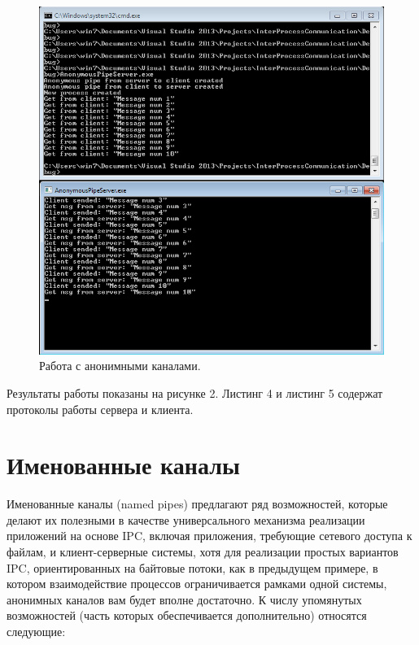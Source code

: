 \documentclass[a4paper, 12pt]{report}		%
\begin{document}
\begin{figure}[h!]
\centering
\includegraphics[scale=0.85]{res/02_anonymous_channels}
\caption{Работа с анонимными каналами.}
\end{figure}
\newpage

Результаты работы показаны на рисунке 2. Листинг 4 и листинг 5 содержат протоколы работы сервера и клиента.





\chapter*{Именованные каналы}

Именованные каналы (named pipes) предлагают ряд возможностей, которые делают их полезными в качестве универсального механизма реализации приложений на основе IPC, включая приложения, требующие сетевого доступа к файлам, и клиент-серверные системы, хотя для реализации простых вариантов IPC, ориентированных на байтовые потоки, как в предыдущем примере, в котором взаимодействие процессов ограничивается рамками одной системы, анонимных каналов вам будет вполне достаточно. К числу упомянутых возможностей (часть которых обеспечивается дополнительно) относятся следующие\cite{Hart}:
\end{document}
